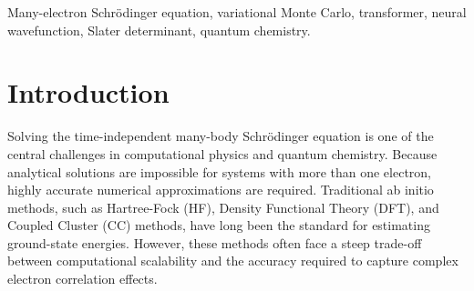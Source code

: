 \begin{abstract}
The application of deep neural networks to Variational Quantum Monte Carlo (VQMC) has
significantly advanced the numerical approximation of ground-state energies for quantum
many-body systems. Among these advancements, the Psiformer architecture—which leverages
self-attention mechanisms to model antisymmetric electron wave functions—has
demonstrated state-of-the-art accuracy. However, the original implementation is built exclusively within
the JAX ecosystem, presenting a barrier to entry for the broader research community
that predominantly utilizes PyTorch. In the interest of scientific reproducibility and computational accessibility, we present an independent open-source PyTorch implementation of the Psiformer architecture. The model design follows von Glehn, Spencer, and Pfau (2023); the code and numerical experiments reported here are the author's own. To validate the implementation, we compute ground-state energies for helium through oxygen and compare them to a Hartree--Fock baseline.
Our results demonstrate that the PyTorch Psiformer consistently recovers significant
electron correlation energy across all tested atoms, confirming that the architecture
is correctly implemented and behaves as expected from variational theory.
By making the framework openly available, this work lowers the barrier for researchers
in computational mathematics, machine learning, and quantum chemistry who wish to
experiment with transformer-based wave functions.
The full source code is made publicly available to facilitate future experimentation and development.
\end{abstract}

\begin{keywords}
Many-electron Schr\"odinger equation, variational Monte Carlo, transformer, neural wavefunction, Slater determinant, quantum chemistry.
\end{keywords}

\section{Introduction}
Solving the time-independent many-body Schr\"odinger equation is one of the central challenges in computational
physics and quantum chemistry. Because analytical solutions are impossible for systems with more than one
electron, highly accurate numerical approximations are required. Traditional ab initio methods,
such as Hartree-Fock (HF), Density Functional Theory (DFT), and Coupled Cluster (CC) methods,
have long been the standard for estimating ground-state energies.
However, these methods often face a steep trade-off between computational scalability and the accuracy required to capture complex electron correlation effects.


